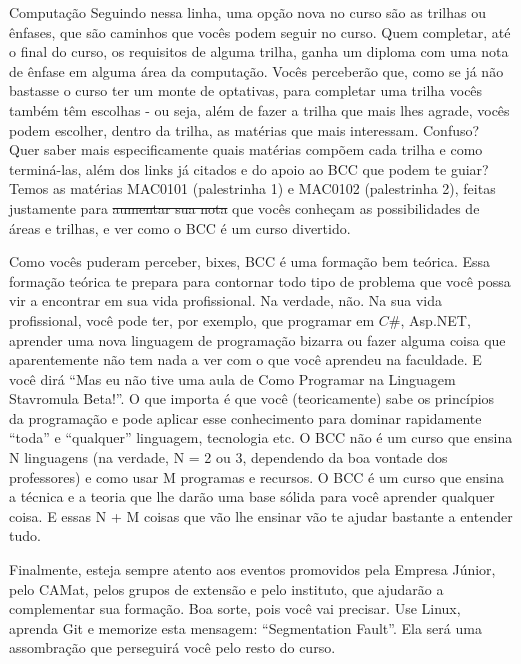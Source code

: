 \begin{subsecao}{Computação}
Seguindo nessa linha, uma opção nova no curso são as trilhas ou ênfases, que
são caminhos que vocês podem seguir no curso. Quem completar, até o final
do curso, os requisitos de alguma trilha, ganha um diploma com uma nota de
ênfase em alguma área da computação. Vocês perceberão que, como se já não bastasse o curso ter
um monte de optativas, para completar uma trilha vocês também têm escolhas - ou seja,
além de fazer a trilha que mais lhes agrade, vocês podem escolher, dentro da trilha, as matérias
que mais interessam. Confuso? Quer saber mais especificamente quais matérias compõem cada trilha
e como terminá-las, além dos links já citados e do apoio ao BCC que podem te guiar? Temos 
as matérias MAC0101 (palestrinha 1) e MAC0102 (palestrinha 2), 
feitas justamente para \sout{aumentar sua nota} que vocês conheçam as 
possibilidades de áreas e trilhas, e ver como o BCC é um curso divertido.

Como vocês puderam perceber, bixes, BCC é uma formação bem teórica. Essa
formação teórica te prepara para contornar todo tipo de problema que você
possa vir a encontrar em sua vida profissional. Na verdade, não. Na sua vida
profissional, você pode ter, por exemplo, que programar em $C\#$, Asp.NET,
aprender uma nova linguagem de programação bizarra ou fazer alguma coisa que
aparentemente não tem nada a ver com o que você aprendeu na faculdade. E você
dirá ``Mas eu não tive uma aula de Como Programar na Linguagem Stavromula
Beta!''. O que importa é que você (teoricamente) sabe os princípios da
programação e pode aplicar esse conhecimento para dominar rapidamente ``toda'' e
``qualquer'' linguagem, tecnologia etc. O BCC não é um curso que ensina N
linguagens (na verdade, N = 2 ou 3, dependendo da boa vontade dos professores) e
como usar M programas e recursos. O BCC é um curso que ensina a técnica e a
teoria que lhe darão uma base sólida para você aprender qualquer coisa. E essas N
+ M coisas que vão lhe ensinar vão te ajudar bastante a entender tudo.

Finalmente, esteja sempre atento aos eventos promovidos pela Empresa Júnior,
pelo CAMat, pelos grupos de extensão e pelo instituto, que ajudarão a
complementar sua formação. Boa sorte, pois você vai precisar. Use Linux, aprenda
Git e memorize esta mensagem: ``Segmentation Fault''. Ela será uma assombração
que perseguirá você pelo resto do curso.

\end{subsecao}
